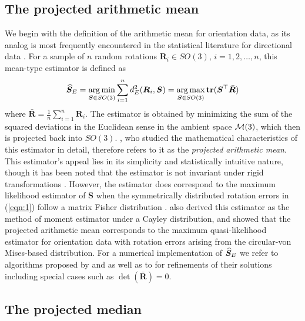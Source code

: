 \subsection{The projected arithmetic mean}
\label{subsec:pam}

We begin with the definition of the arithmetic mean for orientation data, as its analog is most frequently encountered in the statistical literature for directional data \citep[e.g.,~see][]{mardia00}.   For a sample of $n$ random rotations $\bm{R}_i\in SO(3)$, $i=1,2,\dots,n$, this mean-type estimator is defined as
\begin{equation}\label{est:pam}
{\widehat{\bm S}_E}=\operatorname*{arg\,min}_{\bm{S}\in
SO(3)}\sum_{i=1}^n d^2_E(\bm{R}_i,\bm{S})=\operatorname*{arg\,max}_{\bm{S}\in
SO(3)}{\mathbf{tr}}(\bm{S}^{\top}\bar{\bm{R}})
\end{equation}
where $\bar{\bm{R}}=\frac{1}{n}\sum_{i=1}^n\bm{R}_i$. The estimator is obtained by minimizing the sum of the squared deviations in the Euclidean sense in the ambient space $\mathcal{M}(3)$, which then is projected back into $SO(3)$. \citet{moakher02}, who studied the mathematical characteristics of this estimator in detail, therefore refers to it as the \textit{projected arithmetic mean}.    This estimator's appeal lies in its simplicity and statistically intuitive nature, though it has been noted that the estimator is not invariant under rigid transformations \citep[see][]{moakher02}.  However, the estimator does correspond to the maximum likelihood estimator of $\bm{S}$ when the symmetrically distributed rotation errors in (\ref{eqn:1}) follow a matrix Fisher distribution \citep{jupp79}.  \citet{leon06} also derived this estimator as the method of moment estimator under a Cayley  distribution, and \citet{bingham09} showed that the projected arithmetic mean corresponds to the maximum quasi-likelihood estimator for orientation data with rotation errors arising from the circular-von Mises-based distribution.  For a numerical implementation of ${\widehat{\bm S}_E}$ we refer to algorithms proposed by \citet{arun87} and \citet{horn88} as well as to \citet{umeyama91} for refinements of their solutions including special cases such as $\det(\bar{\bm R})=0$.

\subsection{The projected median}
\label{subsec:med}

